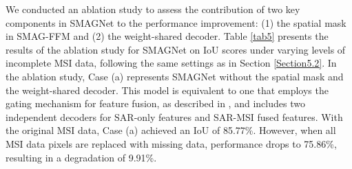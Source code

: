 \documentclass[preprint,12pt,authoryear]{elsarticle}
\begin{document}
We conducted an ablation study to assess the contribution of two key components in SMAGNet to the performance improvement: (1) the spatial mask in SMAG-FFM and (2) the weight-shared decoder. Table \ref{tab5} presents the results of the ablation study for SMAGNet on IoU scores under varying levels of incomplete MSI data, following the same settings as in Section \ref{Section5.2}. In the ablation study, Case (a) represents SMAGNet without the spatial mask and the weight-shared decoder. This model is equivalent to one that employs the gating mechanism for feature fusion, as described in \cite{hosseinpour2022cmgfnet}, and includes two independent decoders for SAR-only features and SAR-MSI fused features. With the original MSI data, Case (a) achieved an IoU of 85.77\%. However, when all MSI data pixels are replaced with missing data, performance drops to 75.86\%, resulting in a degradation of 9.91\%.

\begin{table}[b]
\centering
\caption{Experimental result of the ablation study.}
\label{tab5}
\end{table}
\end{document}
